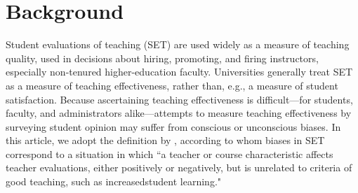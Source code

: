 \documentclass[12pt]{article}
\begin{document}
\begin{quotation}
\begin{abstract}

%

\end{abstract}

\newpage

\end{quotation}

\section{Background}
Student evaluations of teaching (SET) are used widely as a measure of teaching quality,
used in decisions about hiring, promoting, and firing instructors, especially non-tenured 
higher-education faculty. 
Universities generally treat SET as a measure of teaching effectiveness, 
rather than, e.g., a measure of student satisfaction.
Because ascertaining teaching effectiveness is difficult---for students,
faculty, and administrators alike---attempts to measure teaching effectiveness by
surveying student opinion may suffer from conscious or unconscious biases. 
In this article, we adopt the definition by \citet[p.17]{Centra2000}, according to whom 
biases in SET correspond to a situation in which ``a teacher
or course characteristic affects teacher evaluations, either positively or
negatively, but is unrelated to criteria of good teaching, such as increasedstudent learning." 
\end{document}
